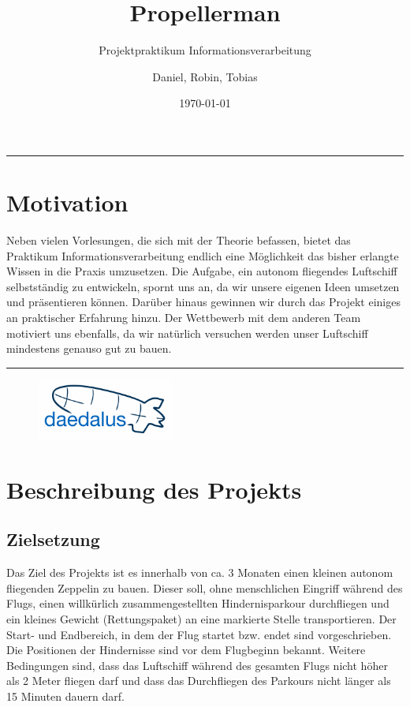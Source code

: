 \documentclass[lang=ngerman,inputenc=utf8,fontsize=10pt]{ldvarticle}
\title{Propellerman}
\subtitle{Projektpraktikum Informationsverarbeitung}
\author{Daniel, Robin, Tobias}
\date{\today}
\begin{document}
\maketitle	
\thispagestyle{empty}
\vspace*{2cm}

\hrule

\section*{Motivation}

Neben vielen Vorlesungen, die sich mit der Theorie befassen, bietet das Praktikum Informationsverarbeitung endlich eine Möglichkeit das bisher erlangte Wissen in die Praxis umzusetzen. Die Aufgabe, ein autonom fliegendes Luftschiff selbstständig zu entwickeln, spornt uns an, da wir unsere eigenen Ideen umsetzen und präsentieren können. Darüber hinaus gewinnen wir durch das Projekt einiges an praktischer Erfahrung hinzu. Der Wettbewerb mit dem anderen Team motiviert uns ebenfalls, da wir natürlich versuchen werden unser Luftschiff mindestens genauso gut zu bauen.




\vspace*{1cm}
\hrule


\begin{figure}[!b]
\centering
\includegraphics[width=0.4\textwidth]{logo_kl.png}
\end{figure}

\newpage


\section{Beschreibung des Projekts}

\subsection*{Zielsetzung}
Das Ziel des Projekts ist es innerhalb von ca. 3 Monaten einen kleinen autonom fliegenden Zeppelin zu bauen. Dieser soll, ohne menschlichen Eingriff während des Flugs, einen willkürlich zusammengestellten Hindernisparkour durchfliegen und ein kleines Gewicht (Rettungspaket) an eine markierte Stelle transportieren. Der Start- und Endbereich, in dem der Flug startet bzw. endet sind vorgeschrieben. Die Positionen der Hindernisse sind vor dem Flugbeginn bekannt. Weitere Bedingungen sind, dass das Luftschiff während des gesamten Flugs nicht höher als 2 Meter fliegen darf und dass das Durchfliegen des Parkours nicht länger als 15 Minuten dauern darf.
\end{document}
